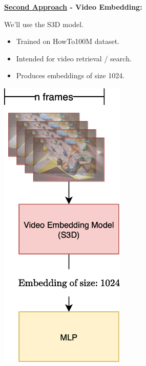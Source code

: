 \begin{frame}
    \begin{minipage}{0.45\textwidth}
        \textbf{\underline{Second Approach} - Video Embedding:}

        \vspace{0.5em}

        We'll use the S3D \cite{S3d} model.

        \begin{itemize}
            \item Trained on HowTo100M dataset.
            \item Intended for video retrieval / search.
            \item Produces embeddings of size 1024.
        \end{itemize}

    \end{minipage}
    \hfill
    \begin{minipage}{0.45\textwidth}
        \centering
        \includegraphics[width=0.45\textwidth]{assets/visuals/video-embedding-approach.drawio.png} %

    \end{minipage}
\end{frame}

